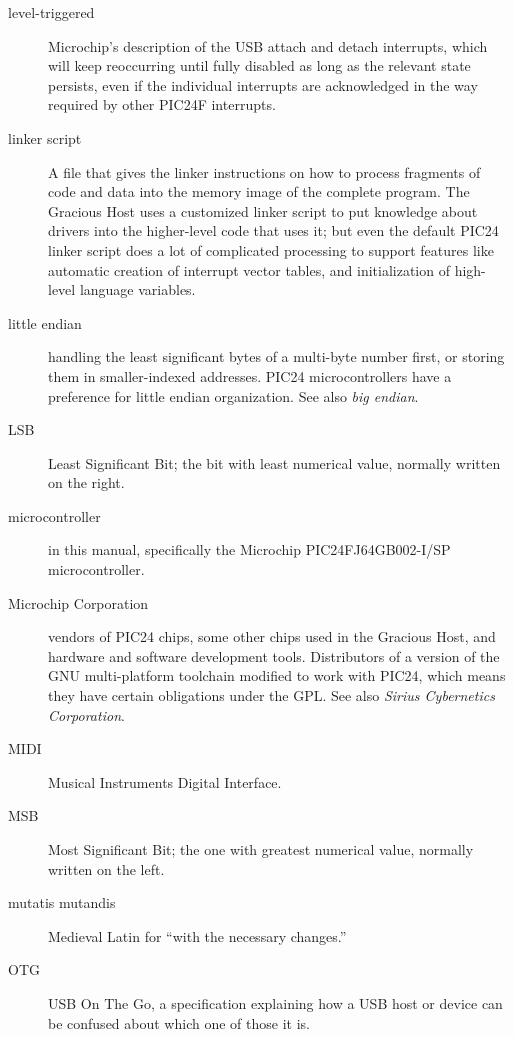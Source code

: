 \begin{description}
\item[level-triggered] Microchip's description of the USB attach and detach
interrupts, which will keep reoccurring until fully disabled as long as the
relevant state persists, even if the individual interrupts are acknowledged
in the way required by other PIC24F interrupts.

\item[linker script]  A file that gives the linker instructions on how to
process fragments of code and data into the memory image of the complete
program.  The Gracious Host uses a customized linker script to put knowledge
about drivers into the higher-level code that uses it; but even the default
PIC24 linker script does a lot of complicated processing to support features
like automatic creation of interrupt vector tables, and initialization of
high-level language variables.

\item[little endian] handling the least significant bytes of a multi-byte
number first, or storing them in smaller-indexed addresses.  PIC24
microcontrollers have a preference for little endian organization.  See also
\emph{big endian}.

\item[LSB] Least Significant Bit; the bit with least numerical value,
normally written on the right.

\item[microcontroller] in this manual, specifically the Microchip
PIC24FJ64GB002-I/SP microcontroller.

\item[Microchip Corporation] vendors of PIC24 chips, some other chips used
in the Gracious Host, and hardware and software development tools. 
Distributors of a version of the GNU multi-platform toolchain modified to
work with PIC24, which means they have certain obligations under the GPL. 
See also \emph{Sirius Cybernetics Corporation}.

\item[MIDI] Musical Instruments Digital Interface.

\item[MSB] Most Significant Bit; the one with greatest numerical value,
normally written on the left.

\item[mutatis mutandis] Medieval Latin for ``with the necessary changes.''

\item[OTG] USB On The Go, a specification explaining how a USB host or
device can be confused about which one of those it is.


\end{description}
